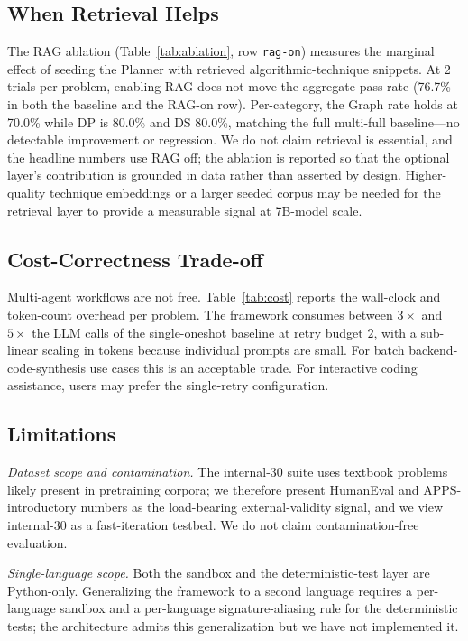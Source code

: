 \documentclass[journal]{IEEEtran}
\begin{document}
\subsection{When Retrieval Helps}
The RAG ablation (Table~\ref{tab:ablation}, row \texttt{rag-on}) measures the marginal effect of seeding the Planner with retrieved algorithmic-technique snippets. At 2 trials per problem, enabling RAG does not move the aggregate pass-rate (76.7\% in both the baseline and the RAG-on row). Per-category, the Graph rate holds at 70.0\% while DP is 80.0\% and DS 80.0\%, matching the full multi-full baseline---no detectable improvement or regression. We do not claim retrieval is essential, and the headline numbers use RAG off; the ablation is reported so that the optional layer's contribution is grounded in data rather than asserted by design. Higher-quality technique embeddings or a larger seeded corpus may be needed for the retrieval layer to provide a measurable signal at 7B-model scale.

\subsection{Cost-Correctness Trade-off}
Multi-agent workflows are not free. Table~\ref{tab:cost} reports the wall-clock and token-count overhead per problem. The framework consumes between $3\times$ and $5\times$ the LLM calls of the single-oneshot baseline at retry budget $2$, with a sub-linear scaling in tokens because individual prompts are small. For batch backend-code-synthesis use cases this is an acceptable trade. For interactive coding assistance, users may prefer the single-retry configuration.

\subsection{Limitations}\label{sec:limitations}

\textit{Dataset scope and contamination.} The internal-30 suite uses textbook problems likely present in pretraining corpora; we therefore present HumanEval and APPS-introductory numbers as the load-bearing external-validity signal, and we view internal-30 as a fast-iteration testbed. We do not claim contamination-free evaluation.

\textit{Single-language scope.} Both the sandbox and the deterministic-test layer are Python-only. Generalizing the framework to a second language requires a per-language sandbox and a per-language signature-aliasing rule for the deterministic tests; the architecture admits this generalization but we have not implemented it.
\end{document}
